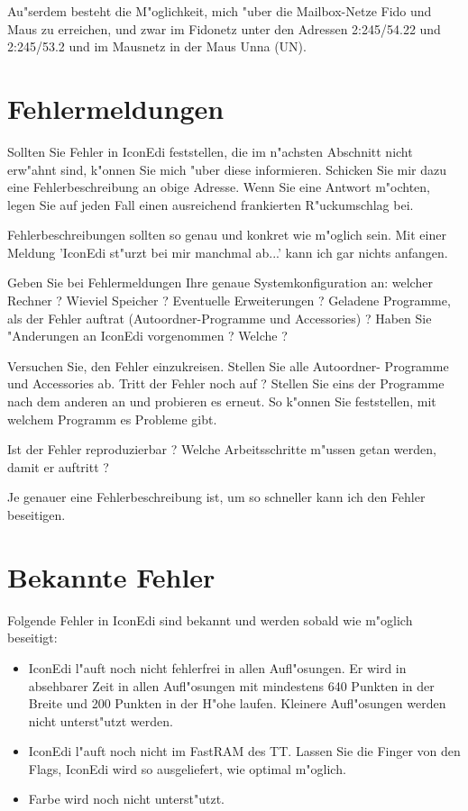 \begin{appendix}
Au"serdem besteht die M"oglichkeit, mich "uber die Mailbox-Netze
Fido und Maus zu erreichen, und zwar im Fidonetz unter den Adressen
2:245/54.22 und 2:245/53.2 und im Mausnetz in der Maus Unna (UN).

\section{Fehlermeldungen}

Sollten Sie Fehler in IconEdi feststellen, die im n"achsten
Abschnitt nicht erw"ahnt sind, k"onnen Sie mich "uber diese 
informieren. Schicken Sie mir dazu eine Fehlerbeschreibung an 
obige Adresse. Wenn Sie eine Antwort m"ochten, legen Sie auf jeden
Fall einen ausreichend frankierten R"uckumschlag bei.

Fehlerbeschreibungen sollten so genau und konkret wie m"oglich sein.
Mit einer Meldung 'IconEdi st"urzt bei mir manchmal ab...' kann ich 
gar nichts anfangen. 

Geben Sie bei Fehlermeldungen Ihre genaue
Systemkonfiguration an: welcher Rechner ? Wieviel Speicher ? 
Eventuelle Erweiterungen ? Geladene Programme, als der Fehler 
auftrat (Autoordner-Programme und Accessories) ? Haben Sie
"Anderungen an IconEdi vorgenommen ? Welche ?

Versuchen Sie, den Fehler einzukreisen. Stellen Sie alle Autoordner-
Programme und Accessories ab. Tritt der Fehler noch auf ? Stellen
Sie eins der Programme nach dem anderen an und probieren es erneut.
So k"onnen Sie feststellen, mit welchem Programm es Probleme gibt.

Ist der Fehler reproduzierbar ? Welche Arbeitsschritte m"ussen getan
werden, damit er auftritt ? 

Je genauer eine Fehlerbeschreibung ist, um so schneller kann ich 
den Fehler beseitigen.

\section{Bekannte Fehler} 
Folgende Fehler in IconEdi sind bekannt und werden sobald wie
m"oglich beseitigt:
\begin{itemize}
 \item IconEdi l"auft noch nicht fehlerfrei in allen Aufl"osungen.
       Er wird in absehbarer Zeit in allen Aufl"osungen mit 
       mindestens 640 Punkten in der Breite und 200 Punkten in der
       H"ohe laufen. Kleinere Aufl"osungen werden nicht unterst"utzt 
       werden. 
 \item IconEdi l"auft noch nicht im FastRAM des TT. Lassen Sie die
       Finger von den Flags, IconEdi wird so ausgeliefert, wie
       optimal m"oglich.
 \item Farbe wird noch nicht unterst"utzt.
\end{itemize}


\end{appendix}
